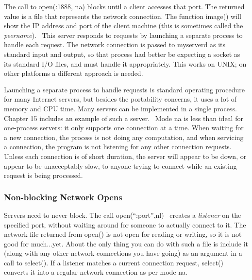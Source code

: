 The call to \textsf{open({\textquotedbl}:1888{\textquotedbl},
{\textquotedbl}na{\textquotedbl})} blocks until a client accesses that
port. The returned value is a file that represents the network
connection. The function \textsf{image()}
will show the IP address and port of the client machine (this is
sometimes called the \textit{peername}). \ This server
responds to requests by launching a separate process to handle each
request. The network connection is passed to \textsf{myserverd} as its
standard input and output, so that process had better be expecting a
socket as its standard I/O files, and must handle it appropriately.
This works on UNIX; on other platforms a different approach is needed.

Launching a separate process to handle requests is standard operating
procedure for many Internet servers, but besides the portability
concerns, it uses a lot of memory and CPU time. Many servers can be
implemented in a single process. Chapter 15 includes an example of such
a server. \ Mode \textsf{{\textquotedbl}na{\textquotedbl}} is less than
ideal for one-process servers: it only supports one connection at a
time. When waiting for a new connection, the process is not doing any
computation, and when servicing a connection, the program is not
listening for any other connection requests. Unless each connection is
of short duration, the server will appear to be down, or appear to be
unacceptably slow, to anyone trying to connect while an existing
request is being processed.

\subsubsection[Non{}-blocking Network Opens]{\sffamily Non-blocking
Network Opens}
Servers need to never block. The call
\textsf{open({\textquotedblleft}:port{\textquotedblright},{\textquotedbl}nl{\textquotedbl})}
\ creates a \textit{listener} on the specified port, without waiting
around for someone to actually connect to it. The network file returned
from \textsf{open()} is not open for reading or writing, so it is not
good for much...yet. About the only thing you can do with such a file
is include it (along with any other network connections you have going)
as an argument in a call to \textsf{select()}. If a listener matches a
current connection request, \textsf{select()} converts it into a
regular network connection as per mode
\textsf{{\textquotedbl}na{\textquotedbl}}.

